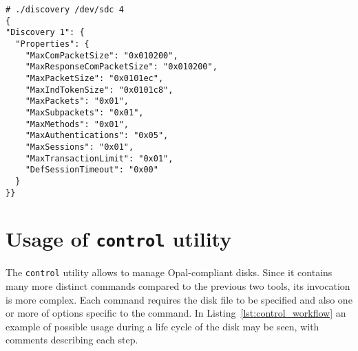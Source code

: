 \begin{lstlisting}[caption=Execution limited to Level 1 Discovery information,label={lst:discovery_some}]
# ./discovery /dev/sdc 4
{
"Discovery 1": {
  "Properties": {
    "MaxComPacketSize": "0x010200",
    "MaxResponseComPacketSize": "0x010200",
    "MaxPacketSize": "0x0101ec",
    "MaxIndTokenSize": "0x0101c8",
    "MaxPackets": "0x01",
    "MaxSubpackets": "0x01",
    "MaxMethods": "0x01",
    "MaxAuthentications": "0x05",
    "MaxSessions": "0x01",
    "MaxTransactionLimit": "0x01",
    "DefSessionTimeout": "0x00"
  }
}}

\end{lstlisting}


\section{Usage of \texttt{control} utility}

The \verb|control| utility allows to manage Opal-compliant disks. Since it contains many more distinct commands compared to the previous two tools, its invocation is more complex. 
Each command requires the disk file to be specified and also one or more of options specific to the command. In Listing~\ref{lst:control_workflow} an example of possible usage during a life cycle of the disk may be seen, with comments describing each step.







